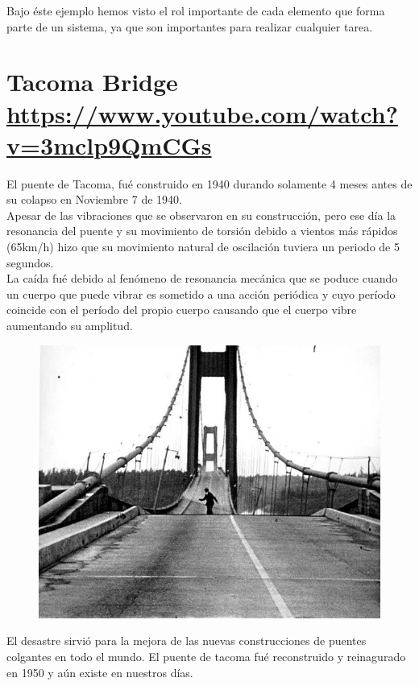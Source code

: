 \documentclass[
	12pt, %
]{fphw}
\begin{document}
Bajo éste ejemplo hemos visto el rol importante de cada elemento que forma parte de un sistema, ya que son importantes para realizar cualquier tarea.

\newpage
\section*{{\color{RoyalPurple}Tacoma Bridge} \url{https://www.youtube.com/watch?v=3mclp9QmCGs}}

El puente de Tacoma, fué construido en 1940 durando solamente 4 meses antes de su colapso en Noviembre 7 de 1940.\\

Apesar de las vibraciones que se observaron en su construcción, pero ese día la resonancia del puente y su movimiento de torsión debido a vientos más rápidos (65km/h) hizo que su movimiento natural de oscilación tuviera un periodo de 5 segundos.\\

La caída fué debido al fenómeno de resonancia mecánica que se poduce cuando un cuerpo que puede vibrar es sometido a una acción periódica y cuyo período coincide con el período del propio cuerpo causando que el cuerpo vibre aumentando su amplitud. 

\begin{figure}[H]
  \centering
  \includegraphics[scale=0.4]{images/tacoma.jpg}
\end{figure}

El desastre sirvió para la mejora de las nuevas construcciones de puentes colgantes en todo el mundo. El puente de tacoma fué reconstruido y reinagurado en 1950 y aún existe en nuestros días.
\end{document}
